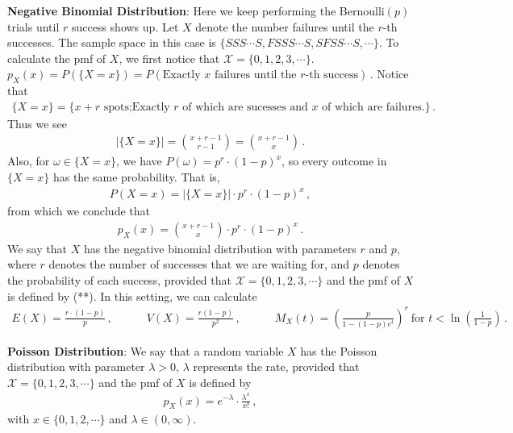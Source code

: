 \documentclass[11pt,oneside]{book}
\theoremstyle{newStyle}
\begin{document}
\textbf{Negative Binomial Distribution}: Here we keep performing the Bernoulli$(p)$ trials until $r$ success shows up. Let $X$ denote the number failures until the $r$-th successes. The sample space in this case is $\{SSS\cdots S, FSSS\cdots S, SFSS\cdots S, \cdots\}$. To calculate the pmf of $X$, we first notice that $\mathcal{X} = \{0,1,2,3,\cdots\}$. $
p_X(x) = P(\{X=x\}) = P(\text{Exactly $x$ failures until the $r$-th success})\,.$
Notice that
\begin{align*}
\{X = x\} = \{x+r\text{ spots;Exactly $r$ of which are sucesses and $x$ of which are failures.}\}\,.
\end{align*}
Thus we see
\begin{align*}
|\{X= x\}| = \binom{x+r-1}{r-1} = \binom{x+r-1}{x}\,.
\end{align*}
Also, for $\omega \in \{X=x\}$, we have $P(\omega) = p^r\cdot (1-p)^x$, so every outcome in $\{X= x\}$ has the same probability. That is,
\begin{align*}
P(X=x) = |\{X=x\}| \cdot p^r \cdot (1-p)^x\,,
\end{align*}
from which we conclude that
\begin{align*}
p_X(x) = \binom{x+r-1}{x}\cdot p^r\cdot (1-p)^x\,. \tag{**}
\end{align*}
We say that $X$ has the negative binomial distribution with parameters $r$ and $p$, where $r$ denotes the number of successes that we are waiting for, and $p$ denotes the probability of each success, provided that $\mathcal{X} = \{0,1,2,3,\cdots\}$ and the pmf of $X$ is defined by (**). In this setting, we can calculate
\begin{align*}
E(X) = \frac{r\cdot (1-p)}{p}\,,\qquad\quad
V(X) = \frac{r(1-p)}{p^2}\,,
\qquad\quad
M_X(t) = \left( \frac{p}{1-(1-p)e^t}\right)^r\ \text{for }t<\ln\left( \frac{1}{1-p}\right)\,.
\end{align*}
\hfill\break	
\hfill\break

\textbf{Poisson Distribution}: We say that a random variable $X$ has the Poisson distribution with parameter $\lambda >0$, $\lambda$ represents the rate, provided that $\mathcal{X} = \{0,1,2,3,\cdots\}$ and the pmf of $X$ is defined by
\begin{align*}
p_X(x) = e^{-\lambda}\cdot \frac{\lambda^x}{x!}\,,
\end{align*}
with $x \in \{0,1,2,\cdots\}$ and $\lambda \in (0,\infty)$. \\
\end{document}
